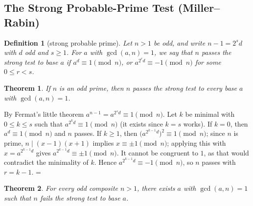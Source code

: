 \documentclass[11pt]{article}
\makeatletter
\let\nt@closedisplay\]
\def\nt@guardedclose{\@ifnextchar\par{\nt@closeafterpar}{\@ifnextchar\end{\postdisplaypenalty\@M\nt@closedisplay}{\nt@closedisplay}}}
\def\nt@closeafterpar\par{\@ifnextchar\par{\nt@closeafterpar}{\@ifnextchar\end{\postdisplaypenalty\@M\nt@closedisplay\par}{\nt@closedisplay\par}}}
\renewenvironment{proof}[1][\proofname]{\par
  \pushQED{\qed}\normalfont\topsep\medskipamount\edef\nt@afterproof{\@endparpenalty=\the\@endparpenalty\relax}\@beginparpenalty\@M\@endparpenalty\@M\let\]\nt@guardedclose\trivlist\item[]\textit{#1\@addpunct{.}} \ignorespaces}{\ifvmode\addpenalty\@M\fi\popQED\nt@afterproof\endtrivlist\@endpefalse}
\theoremstyle{ntstyle}
\newtheorem{theorem}{Theorem}[subsection]
\newtheorem{definition}{Definition}[subsection]
\makeatother
\begin{document}
\subsection{The Strong Probable-Prime Test (Miller--Rabin)}

\begin{definition}[strong probable prime]\label{def:9.4.1}\label{def:strong-probable-prime}
  Let
  $n>1$ be odd, and write $n-1=2^{s}d$ with $d$ odd and $s\ge1$. For $a$ with
  $\gcd(a, n)=1$, we say that $n$ passes the strong test to base $a$ if
  $a^{d}\equiv1\pmod{n}$, or $a^{2^{r}d}\equiv-1\pmod{n}$ for some $0\le r<s$.

\end{definition}

\begin{theorem}\label{thm:9.4.1} If $n$ is
  an odd prime, then $n$ passes the strong test to every base $a$ with
  $\gcd(a, n)=1$.

\end{theorem}

\begin{proof} By Fermat's little theorem
  $a^{n-1}=a^{2^{s}d}\equiv1\pmod{n}$. Let $k$ be minimal with $0\le k\le s$ such that $a^{2^{k}d}\equiv1\pmod{n}$
  (it exists since $k=s$
  works). If $k=0$, then $a^{d}\equiv1\pmod{n}$ and $n$ passes. If
  $k\ge1$, then $\big(a^{2^{k-1}d}\big)^2\equiv1\pmod{n}$; since $n$ is
  prime, $n\mid(x-1)(x+1)$ implies $x\equiv\pm1\pmod{n}$; applying this
  with $x=a^{2^{k-1}d}$ gives
  $a^{2^{k-1}d}\equiv\pm1\pmod{n}$. It cannot be congruent to $1$, as that
  would contradict the minimality of $k$. Hence
  $a^{2^{k-1}d}\equiv-1\pmod{n}$, so $n$ passes with $r=k-1$.
\end{proof}

\begin{theorem}\label{thm:9.4.2} For every odd composite $n>1$, there exists $a$ with
  $\gcd(a, n)=1$ such that $n$ fails the strong test to base $a$.

\end{theorem}
\end{document}
